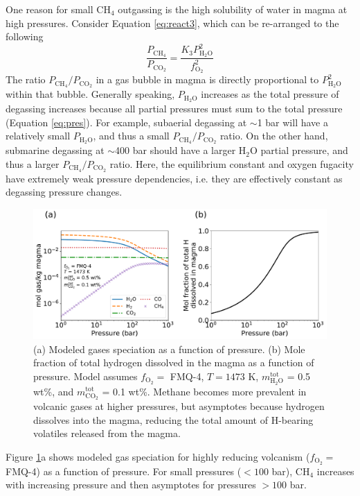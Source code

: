 One reason for small CH$_4$ outgassing is the high solubility of water in magma at high pressures. Consider Equation \eqref{eq:react3}, which can be re-arranged to the following
\begin{equation}\label{eq:react3.1}
    \frac{P_{\mathrm{CH_4}}}{P_{\mathrm{CO_2}}}=\frac{K_3 P_\mathrm{H_2O}^2}{f_\mathrm{O_2}^2}
\end{equation}
The ratio $P_{\mathrm{CH_4}}/P_{\mathrm{CO_2}}$ in a gas bubble in magma is directly proportional to $P_\mathrm{H_2O}^2$ within that bubble. Generally speaking, $P_\mathrm{H_2O}$ increases as the total pressure of degassing increases because all partial pressures must sum to the total pressure (Equation \eqref{eq:pres}). For example, subaerial degassing at $\sim$1 bar will have a relatively small $P_\mathrm{H_2O}$, and thus a small $P_{\mathrm{CH_4}}/P_{\mathrm{CO_2}}$ ratio. On the other hand, submarine degassing at $\sim$400 bar should have a larger H$_2$O partial pressure, and thus a larger $P_{\mathrm{CH_4}}/P_{\mathrm{CO_2}}$ ratio. Here, the equilibrium constant and oxygen fugacity have extremely weak pressure dependencies, i.e. they are effectively constant as degassing pressure changes.

\begin{figure}
  \centering
  \includegraphics[width=\textwidth]{tex/3methane/figures/P_dependence.pdf}
  \caption{(a) Modeled gases speciation as a function of pressure. (b) Mole fraction of total hydrogen dissolved in the magma as a function of pressure. Model assumes $f_\mathrm{O_2}=$ FMQ-4, $T=1473$ K, $m_\mathrm{H_2O}^\mathrm{tot}$ = 0.5 wt\%, and $m_\mathrm{CO_2}^\mathrm{tot}$ = 0.1 wt\%. Methane becomes more prevalent in volcanic gases at higher pressures, but asymptotes because hydrogen dissolves into the magma, reducing the total amount of H-bearing volatiles released from the magma.}
  \label{fig:P_dependence}
\end{figure}

Figure \ref{fig:P_dependence}a shows modeled gas speciation for highly reducing volcanism ($f_\mathrm{O_2}=$ FMQ-4) as a function of pressure. For small pressures ($<100$ bar), CH$_4$ increases with increasing pressure and then asymptotes for pressures $>100$ bar.

